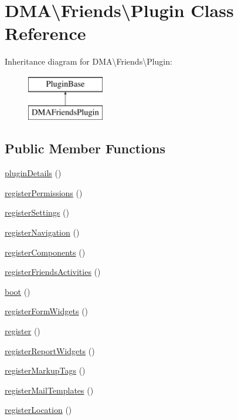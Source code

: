 \hypertarget{classDMA_1_1Friends_1_1Plugin}{}\section{D\+M\+A\textbackslash{}Friends\textbackslash{}Plugin Class Reference}
\label{classDMA_1_1Friends_1_1Plugin}
Inheritance diagram for D\+M\+A\textbackslash{}Friends\textbackslash{}Plugin\+:\begin{figure}[H]
\begin{center}
\leavevmode
\includegraphics[height=2.000000cm]{db/d85/classDMA_1_1Friends_1_1Plugin}
\end{center}
\end{figure}
\subsection*{Public Member Functions}
\begin{DoxyCompactItemize}
\item 
\hyperlink{classDMA_1_1Friends_1_1Plugin_abcae4983c18bdb7b266c6aaa7a081d68}{plugin\+Details} ()
\item 
\hyperlink{classDMA_1_1Friends_1_1Plugin_a1f5f007ec6f0f3f16516cf1a2e19d296}{register\+Permissions} ()
\item 
\hyperlink{classDMA_1_1Friends_1_1Plugin_ad494274bdd3480e4623b5fec196352b3}{register\+Settings} ()
\item 
\hyperlink{classDMA_1_1Friends_1_1Plugin_aaca6d71040b99d2151b2760c93f3e61c}{register\+Navigation} ()
\item 
\hyperlink{classDMA_1_1Friends_1_1Plugin_aba0ea6e404e36aaba19174560d3781ac}{register\+Components} ()
\item 
\hyperlink{classDMA_1_1Friends_1_1Plugin_aee1fcfd6978df90e396e75223e24080a}{register\+Friends\+Activities} ()
\item 
\hyperlink{classDMA_1_1Friends_1_1Plugin_a8ff526c557ed7081a1f4c04194994305}{boot} ()
\item 
\hyperlink{classDMA_1_1Friends_1_1Plugin_a900bf22951ffe9e109d1c14afdd261d5}{register\+Form\+Widgets} ()
\item 
\hyperlink{classDMA_1_1Friends_1_1Plugin_adfd39323d7e2724cdacdb41d590b32e2}{register} ()
\item 
\hyperlink{classDMA_1_1Friends_1_1Plugin_af4c0877dc0c5067f527fa414bc70de57}{register\+Report\+Widgets} ()
\item 
\hyperlink{classDMA_1_1Friends_1_1Plugin_acc1be499ecb2966c300f002f94b9e261}{register\+Markup\+Tags} ()
\item 
\hyperlink{classDMA_1_1Friends_1_1Plugin_aaab460ba502e3b45284785c291e39bf9}{register\+Mail\+Templates} ()
\item 
\hyperlink{classDMA_1_1Friends_1_1Plugin_a4db89cce1a087a7635d5f6b1134854df}{register\+Location} ()
\end{DoxyCompactItemize}
